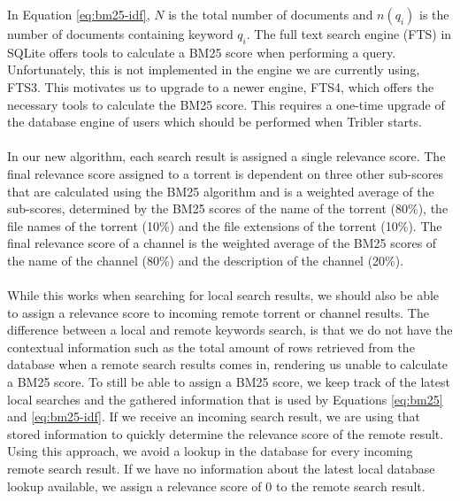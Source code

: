 \noindent In Equation \ref{eq:bm25-idf}, $ N $ is the total number of documents and $ n(q_i) $ is the number of documents containing keyword $ q_i $. The full text search engine (FTS) in SQLite offers tools to calculate a BM25 score when performing a query. Unfortunately, this is not implemented in the engine we are currently using, FTS3. This motivates us to upgrade to a newer engine, FTS4, which offers the necessary tools to calculate the BM25 score. This requires a one-time upgrade of the database engine of users which should be performed when Tribler starts.\\\\
In our new algorithm, each search result is assigned a single relevance score. The final relevance score assigned to a torrent is dependent on three other sub-scores that are calculated using the BM25 algorithm and is a weighted average of the sub-scores, determined by the BM25 scores of the name of the torrent (80\%), the file names of the torrent (10\%) and the file extensions of the torrent (10\%). The final relevance score of a channel is the weighted average of the BM25 scores of the name of the channel (80\%) and the description of the channel (20\%).\\\\
While this works when searching for local search results, we should also be able to assign a relevance score to incoming remote torrent or channel results. The difference between a local and remote keywords search, is that we do not have the contextual information such as the total amount of rows retrieved from the database when a remote search results comes in, rendering us unable to calculate a BM25 score. To still be able to assign a BM25 score, we keep track of the latest local searches and the gathered information that is used by Equations \ref{eq:bm25} and \ref{eq:bm25-idf}. If we receive an incoming search result, we are using that stored information to quickly determine the relevance score of the remote result. Using this approach, we avoid a lookup in the database for every incoming remote search result. If we have no information about the latest local database lookup available, we assign a relevance score of 0 to the remote search result.

